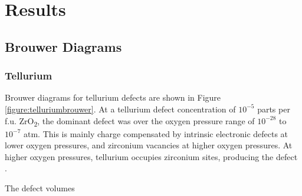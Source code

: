 \documentclass[11pt,a4paper]{article}
\newcommand{\zirconia}{ZrO\textsubscript{2}}
\begin{document}
\section{Results} \label{Results}

\subsection{Brouwer Diagrams} \label{Formation}

\subsubsection*{Tellurium}

Brouwer diagrams for tellurium defects are shown in Figure \ref{figure:telluriumbrouwer}. At a tellurium defect concentration of $10^{-5}$ parts per f.u. \zirconia , the dominant defect was  over the oxygen pressure range of $10^{-28}$ to $10^{-7}$ atm. This is mainly charge compensated by intrinsic electronic defects at lower oxygen pressures, and zirconium vacancies at higher oxygen pressures. At higher oxygen pressures, tellurium occupies zirconium sites, producing the defect .

The defect volumes


\end{document}
